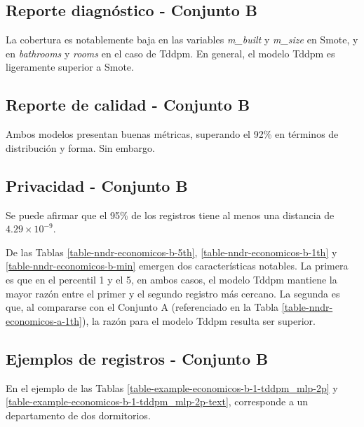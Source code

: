 

\newpage
\subsection{Reporte diagnóstico - Conjunto B}
\label{diagnostico-conjunto-b}
La cobertura es notablemente baja en las variables \emph{m\_built} y \emph{m\_size} en Smote, y en \emph{bathrooms} y \emph{rooms} en el caso de Tddpm. En general, el modelo Tddpm es ligeramente superior a Smote.



\newpage
\subsection{Reporte de calidad - Conjunto B}
\label{calidad-conjunto-b}
Ambos modelos presentan buenas métricas, superando el 92\% en términos de distribución y forma. Sin embargo.


\newpage
\subsection{Privacidad - Conjunto B}
\label{privacidad-conjunto-b}
Se puede afirmar que el 95\% de los registros tiene al menos una distancia de $4.29 \times 10^{-9}$.
 



\newpage
De las Tablas \ref{table-nndr-economicos-b-5th}, \ref{table-nndr-economicos-b-1th} y \ref{table-nndr-economicos-b-min} emergen dos características notables. La primera es que en el percentil 1 y el 5, en ambos casos, el modelo Tddpm mantiene la mayor razón entre el primer y el segundo registro más cercano. La segunda es que, al compararse con el Conjunto A (referenciado en la Tabla \ref{table-nndr-economicos-a-1th}), la razón para el modelo Tddpm resulta ser superior.



\newpage
\subsection{Ejemplos de registros - Conjunto B}
\label{ejemplos-conjunto-b}
En el ejemplo de las Tablas \ref{table-example-economicos-b-1-tddpm_mlp-2p} y \ref{table-example-economicos-b-1-tddpm_mlp-2p-text}, corresponde a un departamento de dos dormitorios.

